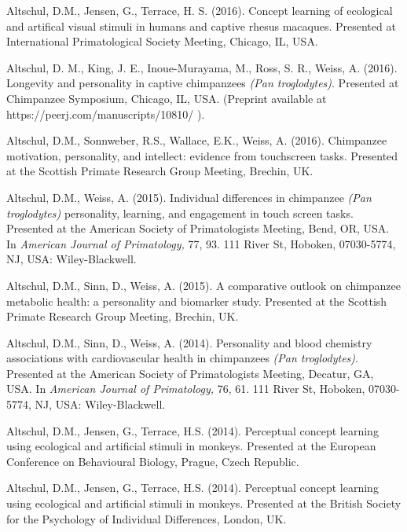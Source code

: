 \documentclass[margin,line]{res}
\begin{document}
\begin{resume}
Altschul, D.M., Jensen, G.,  Terrace, H. S. (2016). Concept learning of ecological and artifical visual stimuli in humans and captive rhesus macaques. Presented at International Primatological Society Meeting, Chicago, IL, USA.

Altschul, D. M., King, J. E., Inoue-Murayama, M., Ross, S. R., Weiss, A. (2016). Longevity and personality in captive chimpanzees {\it (Pan troglodytes)}. Presented at Chimpanzee Symposium, Chicago, IL, USA. (Preprint available at https://peerj.com/manuscripts/10810/ ).

Altschul, D.M., Sonnweber, R.S., Wallace, E.K., Weiss, A. (2016). Chimpanzee motivation, personality, and intellect: evidence from touchscreen tasks. Presented at the Scottish Primate Research Group Meeting, Brechin, UK.

Altschul, D.M., Weiss, A. (2015). Individual differences in chimpanzee {\it (Pan troglodytes)} personality, learning, and engagement in touch screen tasks. Presented at the American Society of Primatologists Meeting, Bend, OR, USA. In {\it American Journal of Primatology,} 77, 93. 111 River St, Hoboken, 07030-5774, NJ, USA: Wiley-Blackwell.

Altschul, D.M., Sinn, D., Weiss, A. (2015). A comparative outlook on chimpanzee metabolic health: a personality and biomarker study. Presented at the Scottish Primate Research Group Meeting, Brechin, UK.

Altschul, D.M., Sinn, D., Weiss, A. (2014).  Personality and blood chemistry associations with cardiovascular health in chimpanzees {\it (Pan troglodytes)}. Presented at the American Society of Primatologists Meeting, Decatur, GA, USA. In {\it American Journal of Primatology,} 76, 61. 111 River St, Hoboken, 07030-5774, NJ, USA: Wiley-Blackwell.

Altschul, D.M., Jensen, G., Terrace, H.S. (2014). Perceptual concept learning using ecological and artificial stimuli in monkeys. Presented at the European Conference on Behavioural Biology, Prague, Czech Republic.

Altschul, D.M., Jensen, G., Terrace, H.S. (2014). Perceptual concept learning using ecological and artificial stimuli in monkeys. Presented at the British Society for the Psychology of Individual Differences, London, UK.


\end{resume}
\end{document}
